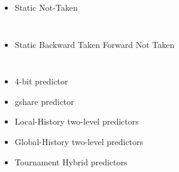 \documentclass[a4paper,12pt]{article}
\begin{document}
\begin{itemize}
    \item Static Not-Taken
        \inputminted[linenos,fontsize=\footnotesize,frame=leftline]{cpp}{files/src-C1-nt_predictor.h}
        \inputminted[linenos,fontsize=\footnotesize,frame=leftline]{cpp}{files/src-C1-nt_predictor.cpp}
    \item Static Backward Taken Forward Not Taken
        \inputminted[linenos,fontsize=\footnotesize,frame=leftline]{cpp}{files/src-C1-btfnt_predictor.h}
        \inputminted[linenos,fontsize=\footnotesize,frame=leftline]{cpp}{files/src-C1-btfnt_predictor.cpp}
    \item 4-bit predictor
    \item gshare predictor
    \item Local-History two-level predictors
    \item Global-History two-level predictors
    \item Tournament Hybrid predictors

\end{itemize}

\end{document}
